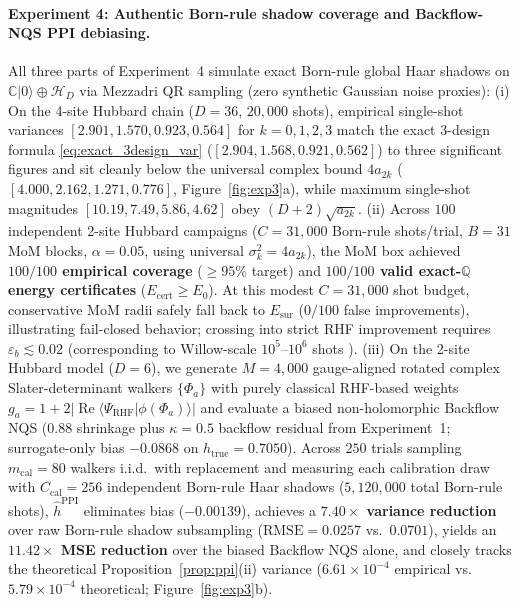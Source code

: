 \documentclass[11pt,a4paper]{article}
\theoremstyle{definition}
\newcommand{\C}{\mathbb{C}}
\newcommand{\Q}{\mathbb{Q}}
\newcommand{\ket}[1]{\lvert #1 \rangle}
\newcommand{\braket}[2]{\langle #1 \vert #2 \rangle}
\begin{document}
\paragraph{Experiment 4: Authentic Born-rule shadow coverage and Backflow-NQS PPI debiasing.}
All three parts of Experiment~4 simulate exact Born-rule global Haar shadows on $\C\ket{0} \oplus \mathcal{H}_D$ via Mezzadri QR sampling (zero synthetic Gaussian noise proxies):
(i) On the 4-site Hubbard chain ($D=36$, $20{,}000$ shots), empirical single-shot variances $[2.901, 1.570, 0.923, 0.564]$ for $k=0,1,2,3$ match the exact 3-design formula \eqref{eq:exact_3design_var} ($[2.904, 1.568, 0.921, 0.562]$) to three significant figures and sit cleanly below the universal complex bound $4 a_{2k}$ ($[4.000, 2.162, 1.271, 0.776]$, Figure~\ref{fig:exp3}a), while maximum single-shot magnitudes $[10.19, 7.49, 5.86, 4.62]$ obey $(D+2)\sqrt{a_{2k}}$.
(ii) Across $100$ independent 2-site Hubbard campaigns ($C = 31{,}000$ Born-rule shots/trial, $B=31$ MoM blocks, $\alpha = 0.05$, using universal $\sigma_k^2 = 4 a_{2k}$), the MoM box achieved \textbf{$100/100$ empirical coverage} ($\ge 95\%$ target) and \textbf{$100/100$ valid exact-$\Q$ energy certificates} ($E_{\mathrm{cert}} \ge E_0$). At this modest $C=31{,}000$ shot budget, conservative MoM radii safely fall back to $E_{\mathrm{sur}}$ ($0/100$ false improvements), illustrating fail-closed behavior; crossing into strict RHF improvement requires $\varepsilon_b \lesssim 0.02$ (corresponding to Willow-scale $10^5$--$10^6$ shots \cite[Table~S1.1]{jiang2026machine}).
(iii) On the 2-site Hubbard model ($D=6$), we generate $M=4{,}000$ gauge-aligned rotated complex Slater-determinant walkers $\{\Phi_a\}$ with purely classical RHF-based weights $g_a = 1 + 2|\operatorname{Re}\braket{\Psi_{\mathrm{RHF}}}{\phi(\Phi_a)}|$ and evaluate a biased non-holomorphic Backflow NQS ($0.88$ shrinkage plus $\kappa=0.5$ backflow residual from Experiment~1; surrogate-only bias $-0.0868$ on $h_{\mathrm{true}} = 0.7050$). Across $250$ trials sampling $m_{\mathrm{cal}}=80$ walkers i.i.d.\ with replacement and measuring each calibration draw with $C_{\mathrm{cal}} = 256$ independent Born-rule Haar shadows ($5{,}120{,}000$ total Born-rule shots), $\widehat{h}^{\mathrm{PPI}}$ eliminates bias ($-0.00139$), achieves a \textbf{$7.40\times$ variance reduction} over raw Born-rule shadow subsampling ($\mathrm{RMSE}=0.0257$ vs.\ $0.0701$), yields an \textbf{$11.42\times$ MSE reduction} over the biased Backflow NQS alone, and closely tracks the theoretical Proposition~\ref{prop:ppi}(ii) variance ($6.61\times 10^{-4}$ empirical vs.\ $5.79\times 10^{-4}$ theoretical; Figure~\ref{fig:exp3}b).
\end{document}
